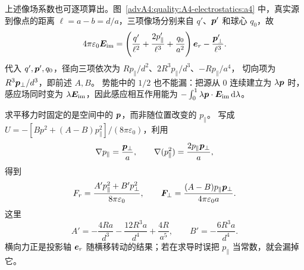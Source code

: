 上述像场系数也可逐项算出。图~\ref{advA4:quality:A4-electrostatics:a4} 中，真实源到像点的距离
$\ell=a-b=d/a$，三项像场分别来自 $q'$、$\bm{p}'$ 和球心 $q_0$，故
\[
 4\pi\varepsilon_0\bm{E}_{\rm im}
 =\left(\frac{q'}{\ell^2}+\frac{2p'_\parallel}{\ell^3}
 +\frac{q_0}{a^2}\right)\bm{e}_r
 -\frac{\bm{p}'_\perp}{\ell^3}.
\]
代入 $q',\bm{p}',q_0$，径向三项依次为
$Rp_\parallel/d^2$、$2R^3p_\parallel/d^3$、$-Rp_\parallel/a^4$，
切向项为 $R^3\bm{p}_\perp/d^3$，即前述 $A,B$。
势能中的 $1/2$ 也不能漏：把源从 $0$ 连续建立为 $\lambda\bm{p}$ 时，感应场同时变为
$\lambda\bm{E}_{\rm im}$，因此感应相互作用能为
$-\int_0^1\lambda\bm{p}\cdot\bm{E}_{\rm im}\mathop{}\!\mathrm d\lambda$。

求平移力时固定的是空间中的 $\bm{p}$，而非随位置改变的 $p_\parallel$。
写成 $U=-[Bp^2+(A-B)p_\parallel^2]/(8\pi\varepsilon_0)$，利用
\[
 \nabla p_\parallel=\frac{\bm{p}_\perp}{a},\qquad
 \nabla(p_\parallel^2)=\frac{2p_\parallel\bm{p}_\perp}{a},
\]
得到
\[
 F_r=\frac{A'p_\parallel^2+B'p_\perp^2}{8\pi\varepsilon_0},\qquad
 \bm{F}_\perp=\frac{(A-B)p_\parallel\bm{p}_\perp}{4\pi\varepsilon_0a}.
\]
这里
\[
 A'=-\frac{4Ra}{d^3}-\frac{12R^3a}{d^4}+\frac{4R}{a^5},
 \qquad B'=-\frac{6R^3a}{d^4}.
\]
横向力正是投影轴 $\bm{e}_r$ 随横移转动的结果；若在求导时误把 $p_\parallel$ 当常数，就会漏掉它。
